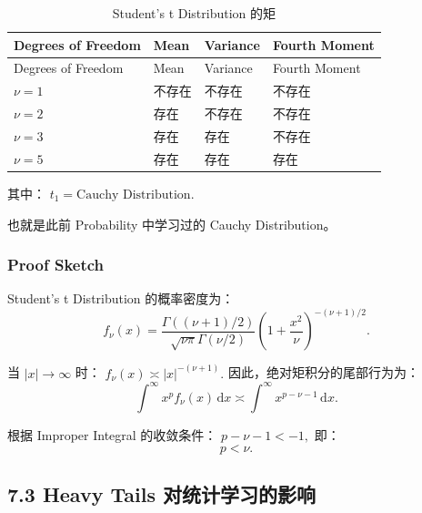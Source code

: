 \begin{readertable}\setlength{\LTcapwidth}{.72\linewidth}
\begin{longtable}[]{@{}
  >{\raggedright\arraybackslash}p{}
  >{\raggedright\arraybackslash}p{}
  >{\raggedright\arraybackslash}p{}
  >{\raggedright\arraybackslash}p{}@{}}
\caption{Student's t Distribution 的矩}\tabularnewline
\toprule
Degrees of Freedom & Mean & Variance & Fourth Moment \\
\midrule
\endfirsthead
\toprule
Degrees of Freedom & Mean & Variance & Fourth Moment \\
\midrule
\endhead
\(\nu=1\) & 不存在 & 不存在 & 不存在 \\
\(\nu=2\) & 存在 & 不存在 & 不存在 \\
\(\nu=3\) & 存在 & 存在 & 不存在 \\
\(\nu=5\) & 存在 & 存在 & 存在 \\
\bottomrule
\end{longtable}
\end{readertable}

其中： \(t_1=\text{Cauchy Distribution}.\)

也就是此前 Probability 中学习过的 Cauchy Distribution。

\begin{samepage}
\hypertarget{proof-sketch}{%
\subsubsection{Proof Sketch}\label{proof-sketch}}

Student's t Distribution 的概率密度为： \[f_\nu(x)
=
\frac{
\Gamma((\nu+1)/2)
}{
\sqrt{\nu\pi}\Gamma(\nu/2)
}
\left(1+\frac{x^2}{\nu}\right)^{-(\nu+1)/2}.\]

当 \(|x|\to\infty\) 时： \(f_\nu(x)\asymp |x|^{-(\nu+1)}.\) 因此，绝对矩积分的尾部行为为： \[\int^\infty x^pf_\nu(x)\,\mathrm dx
\asymp
\int^\infty x^{p-\nu-1}\,\mathrm dx.\]

根据 Improper Integral 的收敛条件： \(p-\nu-1<-1,\) 即： \[\boxed{p<\nu.}\]

\end{samepage}

\hypertarget{heavy-tails-ux5bf9ux7edfux8ba1ux5b66ux4e60ux7684ux5f71ux54cd}{%
\subsection{7.3 Heavy Tails 对统计学习的影响}\label{heavy-tails-ux5bf9ux7edfux8ba1ux5b66ux4e60ux7684ux5f71ux54cd}}

